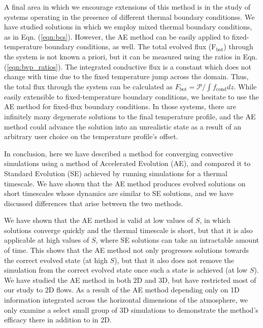 \documentclass[aps, pre, onecolumn, nofootinbib, notitlepage, groupedaddress, amsfonts, amssymb, amsmath, longbibliography]{revtex4-1}
\begin{document}
A final area in which we encourage extensions of this method is in the study of systems
operating in the presence of different thermal boundary conditionss.
We have studied solutions in which we employ mixed thermal boundary conditions,
as in Eqn. (\ref{eqn:bcs}). However, the AE method can be easily applied to fixed-temperature
boundary conditions, as well.  The total evolved flux (F$_{\text{bot}}$)
through the system is not known a priori, but it can be measured using the ratios in
Eqn. (\ref{eqn:bvp_ratios}).  The integrated conductive flux is a constant which
does not change with time due to the fixed temperature jump across the domain.  
Thus, the total flux through the system can be calculated as 
$F_{\text{bot}} = \mathcal{P} / \int f_{\text{cond}} dz$. While easily extensible
to fixed-temperature boundary conditions, we hesitate to use the AE method for 
fixed-flux boundary conditions.  In those systems, there are infinitely many degenerate
solutions to the final temperature profile, and the AE method could advance the
solution into an unrealistic state as a result of an arbitrary user choice on the
temperature profile's offset.

In conclusion, here we have described a method for converging convective simulations using
a method of Accelerated Evolution (AE), and compared it to Standard
Evolution (SE) achieved by running simulations for a thermal timescale.
We have shown that the AE method produces evolved solutions on short timescales
whose dynamics are similar to SE solutions, and we have discussed differences that arise
between the two methods.

We have shown that the AE method is valid at low values of $S$, in which solutions
converge quickly and the thermal timescale is short, but that it is also applicable
at high values of $S$, where SE solutions can take an
intractable amount of time. This shows that the AE method not only progresses
solutions towards the correct evolved state (at high $S$), but that it also does not
remove the simulation from the correct evolved state once such a state is achieved (at low $S$). 
We have studied
the AE method in both 2D and 3D, but have restricted most of our study to 2D flows.
As a result of the AE method depending only on 1D information integrated across
the horizontal dimensions of the atmosphere, we only examine a select small group
of 3D simulations to demonstrate the method's efficacy there in addition to in 2D.
\end{document}
